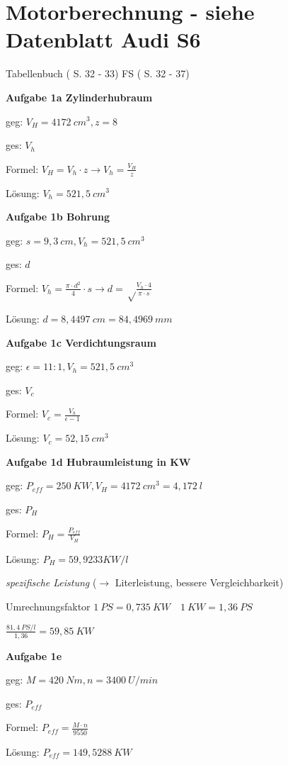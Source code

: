 \section{Motorberechnung - siehe Datenblatt Audi
S6}\label{motorberechnung-siehe-datenblatt-audi-s6}

Tabellenbuch (\textcite{bell:2021:tabellenbuchKfz} S. 32 - 33) FS
(\textcite{bell:2020:formelsammlung} S. 32 - 37)

\textbf{Aufgabe 1a Zylinderhubraum}

geg: $V_H = 4172~cm^3, z = 8$

ges: $V_h$

Formel: $V_H = V_h \cdot z \to V_h = \frac{V_H}{z}$

Lösung: $V_h = 521,5~cm^3$

\textbf{Aufgabe 1b Bohrung}

geg: $s = 9,3~cm, V_h = 521,5~cm^3$

ges: $d$

Formel:
$V_h = \frac{\pi \cdot d^2}{4} \cdot s \to d = \sqrt\frac{V_h \cdot 4}{\pi \cdot s}$

Lösung: $d = 8,4497~cm = 84,4969~mm$

\textbf{Aufgabe 1c Verdichtungsraum}

geg: $\epsilon = 11 : 1, V_h = 521,5~cm^3$

ges: $V_c$

Formel: $V_c = \frac{V_h}{\epsilon - 1}$

Lösung: $V_c = 52,15~cm^3$

\textbf{Aufgabe 1d Hubraumleistung in KW}

geg: $P_{eff} = 250~KW, V_H = 4172~cm^3 = 4,172~l$

ges: $P_H$

Formel: $P_H = \frac{P_{eff}}{V_H}$

Lösung: $P_H = 59,9233 KW/l$

\emph{spezifische Leistung} ($\to$ Literleistung, bessere
Vergleichbarkeit)

Umrechnungsfaktor $\boxed{1~PS = 0,735~KW \quad 1~KW = 1,36~PS}$

$\frac{81,4~PS/l}{1,36} = 59,85~KW$

\textbf{Aufgabe 1e}

geg: $M = 420~Nm, n = 3400~U/min$

ges: $P_{eff}$

Formel: $P_{eff} = \frac{M \cdot n}{9550}$

Lösung: $P_{eff} = 149,5288~KW$

